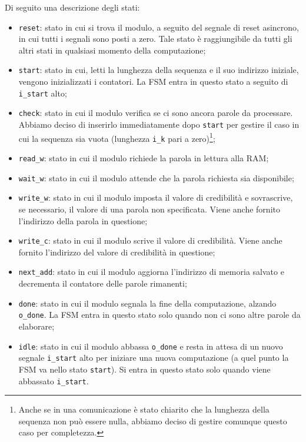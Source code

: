 \documentclass[12pt]{article}
\begin{document}
Di seguito una descrizione degli stati:
\begin{itemize}
    \item \texttt{reset}: stato in cui si trova il modulo, a seguito del segnale di reset asincrono, in cui tutti i segnali sono posti a zero. Tale stato è raggiungibile da tutti gli altri stati in qualsiasi momento della computazione;
    \item \texttt{start}: stato in cui, letti la lunghezza della sequenza e il suo indirizzo iniziale, vengono inizializzati i contatori. La FSM entra in questo stato a seguito di \texttt{i\_start} alto;
    \item \texttt{check}: stato in cui il modulo verifica se ci sono ancora parole da processare. Abbiamo deciso di inserirlo immediatamente dopo \texttt{start} per gestire il caso in cui la sequenza sia vuota (lunghezza \texttt{i\_k} pari a zero)\footnote{Anche se in una comunicazione è stato chiarito che la lunghezza della sequenza non può essere nulla, abbiamo deciso di gestire comunque questo caso per completezza.};
    \item \texttt{read\_w}: stato in cui il modulo richiede la parola in lettura alla RAM;
    \item \texttt{wait\_w}: stato in cui il modulo attende che la parola richiesta sia disponibile;
    \item \texttt{write\_w}: stato in cui il modulo imposta il valore di credibilità e sovrascrive, se necessario, il valore di una parola non specificata. Viene anche fornito l'indirizzo della parola in questione;
    \item \texttt{write\_c}: stato in cui il modulo scrive il valore di credibilità. Viene anche fornito l'indirizzo del valore di credibilità in questione;
    \item \texttt{next\_add}: stato in cui il modulo aggiorna l'indirizzo di memoria salvato e decrementa il contatore delle parole rimanenti;
    \item \texttt{done}: stato in cui il modulo segnala la fine della computazione, alzando \texttt{o\_done}. La FSM entra in questo stato solo quando non ci sono altre parole da elaborare;
    \item \texttt{idle}: stato in cui il modulo abbassa \texttt{o\_done} e resta in attesa di un nuovo segnale \texttt{i\_start} alto per iniziare una nuova computazione (a quel punto la FSM va nello stato \texttt{start}). Si entra in questo stato solo quando viene abbassato \texttt{i\_start}.
\end{itemize}
\end{document}
